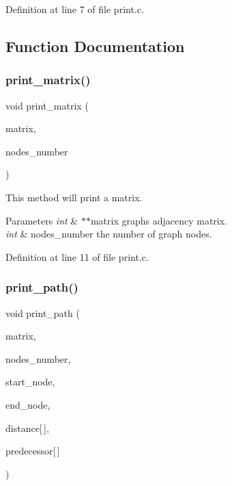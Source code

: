 Definition at line 7 of file print.\+c.



\subsection{Function Documentation}
\mbox{\label{print_8c_a921b41cb0b745c5a64f4987a06648ac2}} 
\subsubsection{print\+\_\+matrix()}
{\footnotesize\ttfamily void print\+\_\+matrix (\begin{DoxyParamCaption}\item[{int $\ast$$\ast$}]{matrix,  }\item[{int}]{nodes\+\_\+number }\end{DoxyParamCaption})}

This method will print a matrix. 
\begin{DoxyParams}{Parameters}
{\em int} & $\ast$$\ast$matrix graph\textquotesingle{}s adjacency matrix. \\
\hline
{\em int} & nodes\+\_\+number the number of graph nodes. \\
\hline
\end{DoxyParams}


Definition at line 11 of file print.\+c.

\mbox{\label{print_8c_a01afacd84ffc5fc3e8dc660873b73452}} 
\subsubsection{print\+\_\+path()}
{\footnotesize\ttfamily void print\+\_\+path (\begin{DoxyParamCaption}\item[{int $\ast$$\ast$}]{matrix,  }\item[{int}]{nodes\+\_\+number,  }\item[{int}]{start\+\_\+node,  }\item[{int}]{end\+\_\+node,  }\item[{int}]{distance[$\,$],  }\item[{int}]{predecessor[$\,$] }\end{DoxyParamCaption})}

